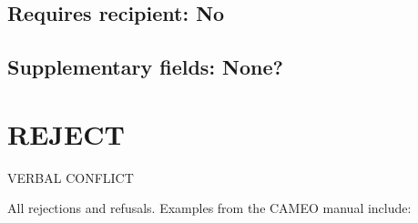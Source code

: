 \documentclass[11pt]{report}
\begin{document}
\subsection{Requires recipient: No}

\subsection{Supplementary fields: None?}

\newpage  


\section{REJECT}

\textsf{VERBAL CONFLICT} \vspace{8pt}

All rejections and refusals. Examples from the CAMEO manual include:
\end{document}
